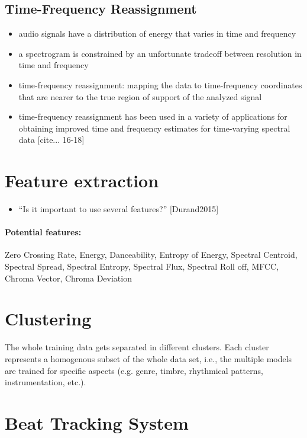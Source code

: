 \documentclass{article}
\begin{document}
\subsection{Time-Frequency Reassignment}
\begin{itemize}
\item audio signals have a distribution of energy that varies in time and frequency
\item a spectrogram is constrained by an unfortunate tradeoff between resolution in time and frequency
\item time-frequency reassignment: mapping the data to time-frequency coordinates that are nearer to the true region of support of the analyzed signal
\item time-frequency reassignment has been used in a variety of applications for obtaining improved time and frequency estimates for time-varying spectral data [cite... 16-18]
\end{itemize}


\section{Feature extraction}

\begin{itemize}
\item ``Is it important to use several features?'' [Durand2015]
\end{itemize}


\paragraph{Potential features:} Zero Crossing Rate, Energy, Danceability, Entropy of Energy, Spectral Centroid, Spectral Spread, Spectral Entropy, Spectral Flux, Spectral Roll off, MFCC, Chroma Vector, Chroma Deviation



\section{Clustering}
The whole training data gets separated in different clusters. Each cluster represents a homogenous subset of the whole data set, i.e., the multiple models are trained for specific aspects (e.g. genre, timbre, rhythmical patterns, instrumentation, etc.). 


\section{Beat Tracking System}
\end{document}
